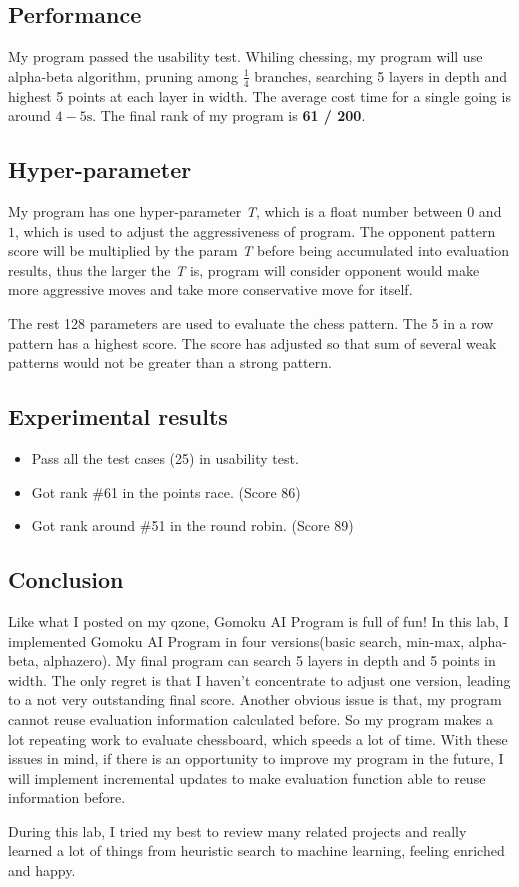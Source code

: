 \documentclass[lang=en,12pt]{elegantpaper}
\begin{document}
\subsection{Performance}
My program passed the usability test.
Whiling chessing, my program will use alpha-beta algorithm, pruning among $\frac{1}{4}$ branches, searching 5 layers in depth and highest 5 points at each layer in width.
The average cost time for a single going is around $4-5\text{s}$.
The final rank of my program is {\bf 61 / 200}.


\subsection{Hyper-parameter}
My program has one hyper-parameter \textsl{T}, which is a float number between $0$ and $1$, which is used to adjust the aggressiveness of program.
The opponent pattern score will be multiplied by the param \textsl{T} before being accumulated into evaluation results,
thus the larger the \textsl{T} is, program will consider opponent would make more aggressive moves and take more conservative move for itself.

The rest 128 parameters are used to evaluate the chess pattern.
The 5 in a row pattern has a highest score. The score has adjusted so that sum of several weak patterns would not be greater than a strong pattern.
\subsection{Experimental results}
\begin{itemize}
  \item Pass all the test cases (25) in usability test.
  \item Got rank \#61 in the points race. (Score 86)
  \item Got rank around \#51 in the round robin. (Score 89)
\end{itemize}

\subsection{Conclusion}
Like what I posted on my qzone, Gomoku AI Program is full of fun!
In this lab, I implemented Gomoku AI Program in four versions(basic search, min-max, alpha-beta, alphazero).
My final program can search 5 layers in depth and 5 points in width. The only regret is that I haven't concentrate to adjust one version, leading to a not very outstanding final score. Another obvious issue is that, my program cannot reuse evaluation information calculated before. So my program makes a lot repeating work to evaluate chessboard, which speeds a lot of time. With these issues in mind, if there is an opportunity to improve my program in the future, I will implement incremental updates to make evaluation function able to reuse information before.

During this lab, I tried my best to review many related projects and really learned a lot of things from heuristic search to machine learning, feeling enriched and happy.


\nocite{*}

\end{document}
